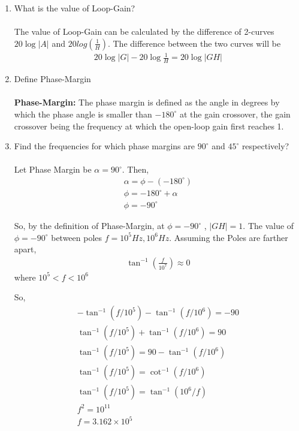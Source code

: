 \begin{enumerate}[label=\thesubsection.\arabic*.,ref=\thesubsection.\theenumi]
\item What is the value of Loop-Gain?\\
\solution\\
The value of Loop-Gain can be calculated by the difference of 2-curves $20\log|A|$ and $20log(\frac{1}{H})$. The difference between the two curves will be
\begin{align}
20 \log |G|-20 \log \frac{1}{H}=20 \log |GH|
\end{align}

\item Define Phase-Margin\\
\solution\\
\textbf{Phase-Margin:} The phase margin is defined as the angle in degrees by which the phase angle is smaller than $-180^{\circ}$ at the gain crossover, the gain crossover being the frequency at which the open-loop gain first reaches 1. \\

\item Find the frequencies for which phase margins are $90^{\circ}$ and $45^{\circ}$ respectively?\\
\solution\\
Let Phase Margin be $\alpha = 90^{\circ}$. Then,
\begin{align}
\alpha = \phi - (-180^{\circ})\\
\phi = -180^{\circ} + \alpha\\
\phi = -90^{\circ}
\end{align}

So, by the definition of Phase-Margin, at $\phi = -90^{\circ}$ , $|GH| = 1 $.  The value of $\phi = -90^{\circ}$ between poles $f=10^{5}Hz,10^{6}Hz$. Assuming the Poles are farther apart, 
\begin{align}
\tan^{-1}(\frac{f}{10^{7}}) \approx 0
\end{align}
where $10^{5} < f < 10^{6}$

So,
\begin{align}
-\tan^{-1}\left(f/10^{5}\right)-\tan^{-1}\left(f/10^{6}\right) = -90\\
\tan^{-1}\left(f/10^{5}\right)+\tan^{-1}\left(f/10^{6}\right) = 90\\
\tan^{-1}\left(f/10^{5}\right) = 90-\tan^{-1}\left(f/10^{6}\right)\\
\tan^{-1}\left(f/10^{5}\right) = \cot^{-1}\left(f/10^{6}\right)\\
\tan^{-1}\left(f/10^{5}\right) = \tan^{-1}\left(10^{6}/f\right)\\
f^{2} = 10^{11}\\
f = 3.162 \times 10^{5}
\end{align}


\end{enumerate}
